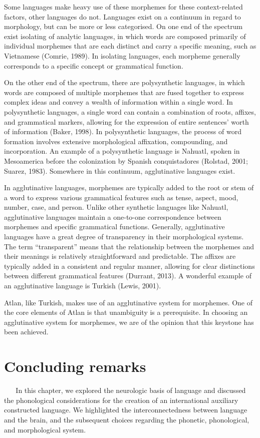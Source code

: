 Some languages make heavy use of these morphemes for these context-related factors, other languages do not. Languages exist on a continuum in regard to morphology, but can be more or less categorised. On one end of the spectrum exist isolating of analytic languages, in which words are composed primarily of individual morphemes that are each distinct and carry a specific meaning, such as Vietnamese (Comrie, 1989). In isolating languages, each morpheme generally corresponds to a specific concept or grammatical function. 

On the other end of the spectrum, there are polysynthetic languages, in which words are composed of multiple morphemes that are fused together to express complex ideas and convey a wealth of information within a single word. In polysynthetic languages, a single word can contain a combination of roots, affixes, and grammatical markers, allowing for the expression of entire sentences' worth of information (Baker, 1998). In polysynthetic languages, the process of word formation involves extensive morphological affixation, compounding, and incorporation. An example of a polysynthetic language is Nahuatl, spoken in Mesoamerica before the colonization by Spanish conquistadores (Rolstad, 2001; Suarez, 1983). Somewhere in this continuum, agglutinative languages exist. 

In agglutinative languages, morphemes are typically added to the root or stem of a word to express various grammatical features such as tense, aspect, mood, number, case, and person. Unlike other synthetic languages like Nahuatl, agglutinative languages maintain a one-to-one correspondence between morphemes and specific grammatical functions. Generally, agglutinative languages have a great degree of transparency in their morphological systems. The term “transparent” means that the relationship between the morphemes and their meanings is relatively straightforward and predictable. The affixes are typically added in a consistent and regular manner, allowing for clear distinctions between different grammatical features (Durrant, 2013). A wonderful example of an agglutinative language is Turkish (Lewis, 2001). 

Atlan, like Turkish, makes use of an agglutinative system for morphemes. One of the core elements of Atlan is that unambiguity is a prerequisite. In choosing an agglutinative system for morphemes, we are of the opinion that this keystone has been achieved.  
  
  
\section{Concluding remarks} 
  
\noindent In this chapter, we explored the neurologic basis of language and discussed the phonological considerations for the creation of an international auxiliary constructed language. We highlighted the interconnectedness between language and the brain, and the subsequent choices regarding the phonetic, phonological, and morphological system.

